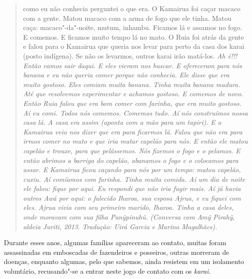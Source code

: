 \begin{quote}
{como eu não conhecia perguntei o que era. O Kamairua foi caçar macaco
com a gente. Matou macaco com a arma de fogo que ele tinha. Matou caça:
macaco"-da"-noite, mutum, inhambu. Ficamos lá e assamos no fogo. E
comemos. E ficamos muito tempo lá no mato. O Ruia foi atrás da gente e
falou para o Kamairua que queria nos levar para perto da casa dos karai
(posto indígena). Se não os levarmos, outros karai irão matá-los.}
\emph{Ah é!!! Então vamos sair daqui. E eles vieram nos buscar. E
ofereceram para nós banana e eu não queria comer porque não conhecia.
Ele disse que era muito gostoso. Eles comiam muita banana. Tinha muita
banana madura. Até que resolvemos experimentar e achamos gostoso. E
comemos de novo. Então Ruia falou que era bom comer com farinha, que era
muito gostoso. Aí eu comi. Todos nós comemos. Comemos tudo. Aí nós
construímos nossa casa lá. A casa era assim (aponta com a mão para um
tapiri). E o Kamairua veio nos dizer que era para ficarmos lá. Falou que
não era para irmos comer no mato e que iria matar capelão para nós. E
então ele matou capelão e trouxe, para que pelássemos. Nós fizemos o
fogo e o pelamos. E então abrimos a barriga do capelão, abanamos o fogo
e o colocamos para assar. E Kamairua ficou caçando para nós por um
tempo: matou capelão, cuxiu. Aí comíamos com farinha. Tinha muita
comida. Aí um dia de noite ele falou: fique por aqui. Eu respondi que
não iria fugir mais. Aí já havia outros Awá por aqui: o falecido Iharoa,
sua esposa Ajrua, e eu fiquei com eles. Ajrua vivia com seu primeiro
marido, Iharoa. Tinha a casa deles, onde moravam com sua filha
Panỹpinuhũ. (Conversa com Amỹ Pirahỹ, aldeia Juriti, 2013.
Tradução: Uirá Garcia e Marina Magalhães).}
\end{quote}

Durante esses anos, algumas famílias apareceram ao contato, muitas foram
assassinadas em emboscadas de fazendeiros e posseiros, outras morreram
de doenças, enquanto algumas, pelo que sabemos, ainda resistem em um
isolamento voluntário, recusando"-se a entrar neste jogo de contato com
os \emph{karai}.

